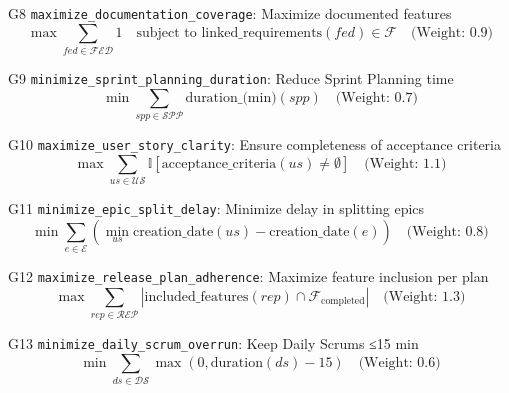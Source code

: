 \documentclass[12pt]{article}
\begin{document}
    \item[G8] \texttt{maximize\_documentation\_coverage}: Maximize documented features
    \[
    \max \sum_{fed \in \mathcal{FED}} 1 \quad \text{subject to } \text{linked\_requirements}(fed) \in \mathcal{F} \quad \text{(Weight: 0.9)}
    \]
    
    \item[G9] \texttt{minimize\_sprint\_planning\_duration}: Reduce Sprint Planning time
    \[
    \min \sum_{spp \in \mathcal{SPP}} \text{duration\_(min)}(spp) \quad \text{(Weight: 0.7)}
    \]
    
    \item[G10] \texttt{maximize\_user\_story\_clarity}: Ensure completeness of acceptance criteria
    \[
    \max \sum_{us \in \mathcal{US}} \mathbb{I}[\text{acceptance\_criteria}(us) \neq \emptyset] \quad \text{(Weight: 1.1)}
    \]
    
    \item[G11] \texttt{minimize\_epic\_split\_delay}: Minimize delay in splitting epics
    \[
    \min \sum_{e \in \mathcal{E}} \left( \min_{us} \text{creation\_date}(us) - \text{creation\_date}(e) \right) \quad \text{(Weight: 0.8)}
    \]
    
    \item[G12] \texttt{maximize\_release\_plan\_adherence}: Maximize feature inclusion per plan
    \[
    \max \sum_{rep \in \mathcal{REP}} \left| \text{included\_features}(rep) \cap \mathcal{F}_{\text{completed}} \right| \quad \text{(Weight: 1.3)}
    \]
    
    \item[G13] \texttt{minimize\_daily\_scrum\_overrun}: Keep Daily Scrums ≤15 min
    \[
    \min \sum_{ds \in \mathcal{DS}} \max(0, \text{duration}(ds) - 15) \quad \text{(Weight: 0.6)}
    \]
    
\end{document}
